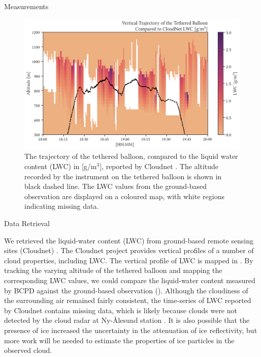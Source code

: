 \documentclass[final]{beamer}
\newlength{\colwidth}
\begin{document}
\begin{frame}[t]
\begin{columns}[t]
\begin{column}{\colwidth}
\begin{block}{Measurements}
        \begin{figure}
          \centering
          \includegraphics[width=0.95\colwidth]{img/ts_alt.png}
          \caption{The trajectory of the tethered balloon, compared to the liquid water content (LWC) in [g/m$^3$], reported by Cloudnet \cite{illingworth2007cloudnet}. The altitude recorded by the instrument on the tethered balloon is shown in black dashed line. The LWC values from the ground-based observation are displayed on a coloured map, with white regions indicating missing data.}
          \label{fig:02}
        \end{figure}

      \end{block}

      \begin{exampleblock}{Data Retrieval}

        We retrieved the liquid-water content (LWC) from ground-based remote sensing sites (Cloudnet) \cite{illingworth2007cloudnet}. The Cloudnet project provides vertical profiles of a number of cloud properties, including LWC. The vertical profile of LWC is mapped in . By tracking the varying altitude of the tethered balloon and mapping the corresponding LWC values, we could compare the liquid-water content measured by BCPD against the  ground-based observation (). Although the cloudiness of the surrounding air remained fairly consistent, the time-series of LWC reported by Cloudnet contains missing data, which is likely because clouds were not detected by the cloud radar at Ny-\r{A}lesund station \cite{illingworth2007cloudnet}. It is also possible that the presence of ice increased the uncertainty in the attenuation of ice reflectivity, but more work will be needed to estimate the properties of ice particles in the observed cloud.


\end{exampleblock}
\end{column}
\end{columns}
\end{frame}
\end{document}
